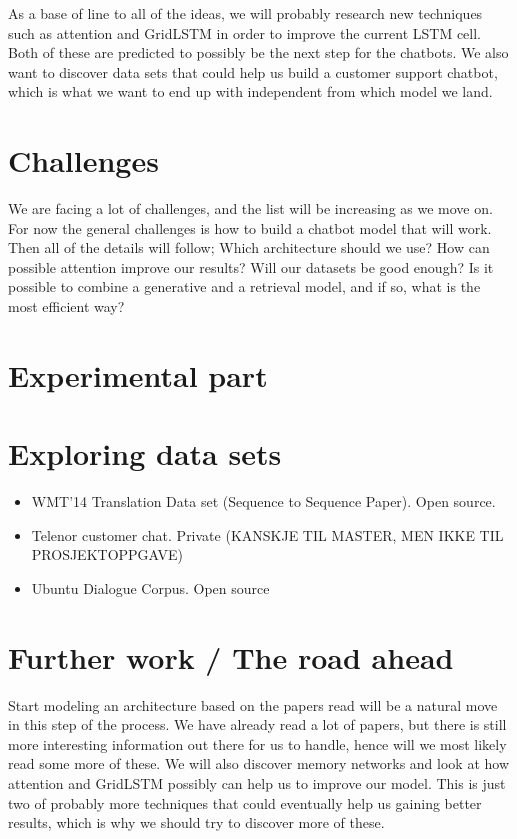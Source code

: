\documentclass{article} %
\begin{document}
As a base of line to all of the ideas, we will probably research new techniques such as attention and GridLSTM in order to improve the current LSTM cell. Both of these are predicted to possibly be the next step for the chatbots. We also want to discover data sets that could help us build a customer support chatbot, which is what we want to end up with independent from which model we land.



\section{Challenges}

We are facing a lot of challenges, and the list will be increasing as we move on. For now the general challenges is how to build a chatbot model that will work. Then all of the details will follow; Which architecture should we use? How can possible attention improve our results? Will our datasets be good enough? Is it possible to combine a generative and a retrieval model, and if so, what is the most efficient way?

\section{Experimental part}
\section{Exploring data sets}

\begin{itemize}
    \item WMT'14 Translation Data set (Sequence to Sequence Paper). Open source.
    \item Telenor customer chat. Private (KANSKJE TIL MASTER, MEN IKKE TIL PROSJEKTOPPGAVE)
    \item Ubuntu Dialogue Corpus. Open source
\end{itemize}

\section{Further work / The road ahead}
Start modeling an architecture based on the papers read will be a natural move in this step of the process. We have already read a lot of papers, but there is still more interesting information out there for us to handle, hence will we most likely read some more of these. We will also discover memory networks and look at how attention and GridLSTM possibly can help us to improve our model. This is just two of probably more techniques that could eventually help us gaining better results, which is why we should try to discover more of these.
\end{document}
